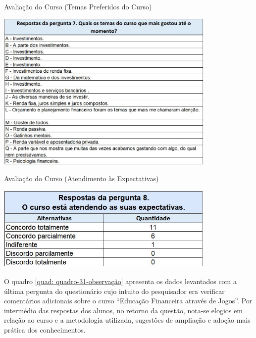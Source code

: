 \graphicspath{{quadros/}} 
\begin{quadro}[!ht]
\centering
\begin{minipage}{0.80\textwidth}
\caption{ Avaliação do Curso (Temas Preferidos do Curso)}
\centering
\includegraphics[width=0.80\textwidth]{quadro-29-temas-preferidos}
\label{quad: quadro-29-temas-preferidos}
\end{minipage}
\end{quadro}

\graphicspath{{quadros/}} 
\begin{quadro}[!ht]
\centering
\begin{minipage}{0.80\textwidth}
\caption{Avaliação do Curso (Atendimento às Expectativas)}
\centering
\includegraphics[width=0.80\textwidth]{quadro-30-expectativas}
\label{quad: quadro-30-expectativas}
\end{minipage}
\end{quadro}

\newpage
O quadro \ref{quad: quadro-31-observação} apresenta os dados levantados com a última pergunta do questionário cujo intuito do pesquisador era verificar comentários adicionais sobre o curso “Educação Financeira através de Jogos”. Por intermédio das respostas dos alunos, no retorno da questão, nota-se elogios em relação ao curso e a metodologia utilizada, sugestões de ampliação e adoção mais prática dos conhecimentos.

